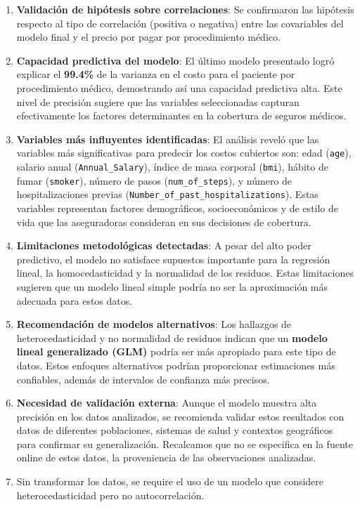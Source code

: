 \documentclass[
]{article}
\begin{document}
\begin{enumerate}
\def\labelenumi{\arabic{enumi}.}
\item
  \textbf{Validación de hipótesis sobre correlaciones}: Se confirmaron
  las hipótesis respecto al tipo de correlación (positiva o negativa)
  entre las covariables del modelo final y el precio por pagar por
  procedimiento médico.
\item
  \textbf{Capacidad predictiva del modelo}: El último modelo presentado
  logró explicar el \textbf{99.4\%} de la varianza en el costo para el
  paciente por procedimiento médico, demostrando así una capacidad
  predictiva alta. Este nivel de precisión sugiere que las variables
  seleccionadas capturan efectivamente los factores determinantes en la
  cobertura de seguros médicos.
\item
  \textbf{Variables más influyentes identificadas}: El análisis reveló
  que las variables más significativas para predecir los costos
  cubiertos son: edad (\texttt{age}), salario anual
  (\texttt{Annual\_Salary}), índice de masa corporal (\texttt{bmi}),
  hábito de fumar (\texttt{smoker}), número de pasos
  (\texttt{num\_of\_steps}), y número de hospitalizaciones previas
  (\texttt{Number\_of\_past\_hospitalizations}). Estas variables
  representan factores demográficos, socioeconómicos y de estilo de vida
  que las aseguradoras consideran en sus decisiones de cobertura.
\item
  \textbf{Limitaciones metodológicas detectadas}: A pesar del alto poder
  predictivo, el modelo no satisface supuestos importante para la
  regresión lineal, la homocedasticidad y la normalidad de los residuos.
  Estas limitaciones sugieren que un modelo lineal simple podría no ser
  la aproximación más adecuada para estos datos.
\item
  \textbf{Recomendación de modelos alternativos}: Los hallazgos de
  heterocedasticidad y no normalidad de residuos indican que un
  \textbf{modelo lineal generalizado (GLM)} podría ser más apropiado
  para este tipo de datos. Estos enfoques alternativos podrían
  proporcionar estimaciones más confiables, además de intervalos de
  confianza más precisos.
\item
  \textbf{Necesidad de validación externa}: Aunque el modelo muestra
  alta precisión en los datos analizados, se recomienda validar estos
  resultados con datos de diferentes poblaciones, sistemas de salud y
  contextos geográficos para confirmar su generalización. Recalcamos que
  no se especifica en la fuente online de estos datos, la proveniencia
  de las observaciones analizadas.
\item
  Sin transformar los datos, se require el uso de un modelo que
  considere heterocedasticidad pero no autocorrelación.
\end{enumerate}
\end{document}
